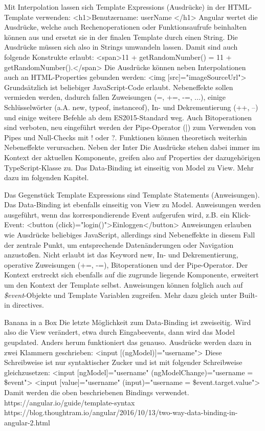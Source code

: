 Mit Interpolation lassen sich Template Expressions (Ausdrücke) in der HTML-Template verwenden: 
<h1>Benutzername: {{ userName }}</h1>
Angular wertet die Ausdrücke, welche auch Rechenoperationen oder Funktionsaufrufe beinhalten können aus und ersetzt sie in der finalen Template durch einen String. Die Ausdrücke müssen sich also in Strings umwandeln lassen. Damit sind auch folgende Konstrukte erlaubt:
<span>11 + {{getRandomNumber()}} = {{11 + getRandomNumber()}}.</span>
Die Ausdrücke können neben Interpolationen auch an HTML-Properties gebunden werden:
<img [src]="imageSourceUrl">
Grundsätzlich ist beliebiger JavaScript-Code erlaubt. Nebeneffekte sollen vermieden werden, dadurch fallen Zuweisungen (=, +=, -=, ...), einige Schlüsselwörter (a.A. new, typeof, instanceof), In- und Dekrementierung (++, --) und einige weitere Befehle ab dem ES2015-Standard weg. Auch Bitoperationen sind verboten, neu eingeführt werden der Pipe-Operator (|) zum Verwenden von Pipes und Null-Checks mit ! oder ?. Funktionen können theoretisch weiterhin Nebeneffekte verursachen. Neben der Inter
Die Ausdrücke stehen dabei immer im Kontext der aktuellen Komponente, greifen also auf Properties der dazugehörigen TypeScript-Klasse zu. Das Data-Binding ist einseitig von Model zu View. Mehr dazu im folgenden Kapitel.

Das Gegenstück Template Expressions sind Template Statements (Anweisungen). Das Data-Binding ist ebenfalls einseitig von View zu Model. Anweisungen werden ausgeführt, wenn das korrespondierende Event aufgerufen wird, z.B. ein Klick-Event:
<button (click)="login()">Einloggen</button>
Anweisungen erlauben wie Ausdrücke beliebiges JavaScript, allerdings sind Nebeneffekte in diesem Fall der zentrale Punkt, um entsprechende Datenänderungen oder Navigation anzustoßen. Nicht erlaubt ist das Keyword new, In- und Dekrementierung, operative Zuweisungen (+=, -=), Bitoperationen und der Pipe-Operator.
Der Kontext erstreckt sich ebenfalls auf die zugrunde liegende Komponente, erweitert um den Kontext der Template selbst. Anweisungen können folglich auch auf \textit{\$event}-Objekte und Template Variablen zugreifen. Mehr dazu gleich unter Built-in directives.

Banana in a Box
Die letzte Möglichkeit zum Data-Binding ist zweiseitig. Wird also die View verändert, etwa durch Eingabeevents, dann wird das Model geupdated. Anders herum funktioniert das genauso. Ausdrücke werden dazu in zwei Klammern geschrieben:
<input [(ngModel)]="username">
Diese Schreibweise ist nur syntaktischer Zucker und ist mit folgender Schreibweise gleichzusetzen:
<input [ngModel]="username" (ngModelChange)="username = \$event">
<input [value]="username" (input)="username = \$event.target.value">
Damit werden die oben beschriebenen Bindings verwendet. 
https://angular.io/guide/template-syntax
https://blog.thoughtram.io/angular/2016/10/13/two-way-data-binding-in-angular-2.html

